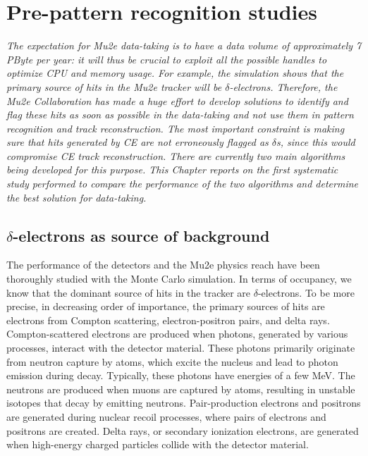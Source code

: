 \chapter{Pre-pattern recognition studies}\label{delta}
\textit{The expectation for Mu2e data-taking 
is to have a data volume of approximately 7 
PByte per year: it will thus be crucial to 
exploit all the possible handles to optimize 
CPU and memory usage. For example, the simulation 
shows that the primary source of hits in the 
Mu2e tracker will be $\delta$-electrons. 
Therefore, the Mu2e Collaboration has made 
a huge effort to develop solutions to identify 
and flag these hits as soon as possible in the 
data-taking and not use them in pattern 
recognition and track reconstruction. 
The most important constraint is 
making sure that hits generated by CE are 
not erroneously flagged as $\delta$s, 
since this would compromise CE track reconstruction. 
There are currently two main algorithms being 
developed for this purpose. This Chapter reports 
on the first systematic study performed to compare 
the performance of the two algorithms and determine 
the best solution for data-taking. }

\section{$\delta$-electrons as source of background}

The performance of the detectors and the Mu2e 
physics reach have been thoroughly studied with 
the Monte Carlo simulation. In terms of 
occupancy, we know that the dominant 
source of hits in the tracker are 
$\delta$-electrons.  
To be more precise, in 
decreasing order 
of importance, the primary sources of hits are 
electrons 
from Compton scattering, electron-positron pairs, 
and delta rays.
Compton-scattered electrons are produced 
when photons, generated by various processes, 
interact with the 
detector material. These photons primarily 
originate from 
neutron capture by atoms, which excite the 
nucleus and lead  
to photon emission during decay. Typically, 
these photons have 
energies of a few MeV. The neutrons are 
produced when muons are 
captured by atoms, resulting in unstable 
isotopes that decay by 
emitting neutrons. Pair-production 
electrons and positrons are 
generated during nuclear recoil 
processes, where pairs of electrons 
and positrons are created. Delta rays, 
or secondary ionization electrons, 
are generated when high-energy 
charged particles collide with the detector material.


